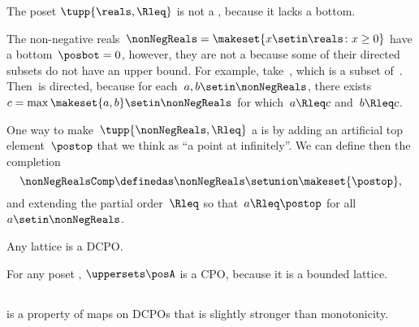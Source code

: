 \begin{example}
    \label{exa:Rcomp}
    The poset $\tupp{\reals, \Rleq}$ is not a \CPO, because it lacks a bottom.

    The non-negative reals~$\nonNegReals=\makeset{x\setin\reals \colon x\geq0}$ have a bottom~$\posbot=0$, however, they are not a \DCPO because some of their directed subsets do not have an upper bound.
    For example, take~\nonNegReals, which is a subset of~\nonNegReals .
    Then~\nonNegReals  is directed, because for each~$a,b\setin\nonNegReals$, there exists~$c=\max\makeset{a,b}\setin\nonNegReals$ for which~$a\Rleq c$ and~$b\Rleq c$.

    One way to make~$\tupp{ \nonNegReals,\Rleq} $ a \CPO is by adding an artificial top element~$\postop$ that we think as ``a point at infinitely''.
    We can define then the completion
    \begin{equation}
        \nonNegRealsComp\definedas\nonNegReals\setunion\makeset{\postop},
    \end{equation} and extending the partial order~$\Rleq$ so that~$a\Rleq\postop$ for all~$a\setin\nonNegReals$.
\end{example}

\begin{example}
    Any lattice is a DCPO.
\end{example}
\begin{example}
    For any poset \posA, $\uppersets \posA$ is a CPO, because it is a bounded lattice.
\end{example}

\subsection{\scottcontinuity}

\scottcontinuity is a property of maps on DCPOs that is slightly stronger than monotonicity.

